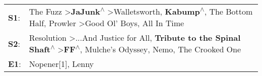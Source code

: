 \begin{supertabular}{p{0.03\textwidth}p{0.92\textwidth}}
 \textbf{S1}:  &  The Fuzz\textsuperscript{} \textgreater \enspace \textbf{JaJunk\textsuperscript{$\wedge$}} \textgreater \enspace Walletsworth\textsuperscript{}, \enspace \textbf{Kabump\textsuperscript{$\wedge$}}, \enspace The Bottom Half\textsuperscript{}, \enspace Prowler\textsuperscript{} \textgreater \enspace Good Ol' Boys\textsuperscript{}, \enspace All In Time\textsuperscript{}  \enspace  \\
 \textbf{S2}:  &                         Resolution\textsuperscript{} \textgreater \enspace ...And Justice for All\textsuperscript{}, \enspace \textbf{Tribute to the Spinal Shaft\textsuperscript{$\wedge$}} \textgreater \enspace \textbf{FF\textsuperscript{$\wedge$}}, \enspace Mulche's Odyssey\textsuperscript{}, \enspace Nemo\textsuperscript{}, \enspace The Crooked One\textsuperscript{}  \enspace  \\
 \textbf{E1}:  &                                                                                                                                                                                                                                                                                                                     Nopener[1]\textsuperscript{}, \enspace Lenny\textsuperscript{}  \enspace  \\
\end{supertabular}
